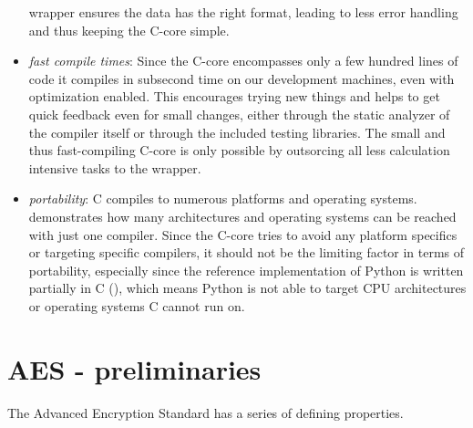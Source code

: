 \begin{itemize}
  wrapper ensures the data has the right format, leading to less error
  handling and thus keeping the C-core simple.
\item
  \emph{fast compile times}: Since the C-core encompasses only a few
  hundred lines of code it compiles in subsecond time on our development
  machines, even with optimization enabled. This encourages trying new
  things and helps to get quick feedback even for small changes, either
  through the static analyzer of the compiler itself or through the
  included testing libraries. The small and thus fast-compiling C-core
  is only possible by outsorcing all less calculation intensive tasks to
  the wrapper.
\item
  \emph{portability}: C compiles to numerous platforms and operating
  systems. \cite{gccsys} demonstrates how
  many architectures and operating systems can be reached with just one
  compiler. Since the C-core tries to avoid any platform specifics or
  targeting specific compilers, it should not be the limiting factor in
  terms of portability, especially since the reference implementation of
  Python is written partially in C (\cite{pyref}),
  which means Python is not able to target CPU architectures or
  operating systems C cannot run on.
\end{itemize}

\hypertarget{aes---preliminaries}{%
\section{AES - preliminaries}\label{aes---preliminaries}}

The Advanced Encryption Standard has a series of defining properties.

